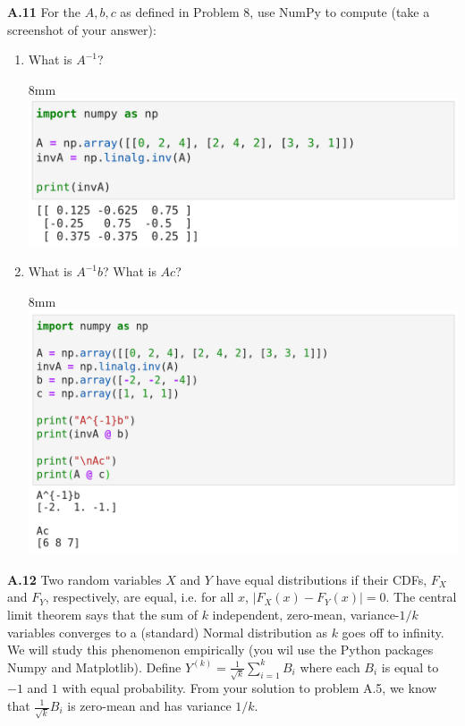 \documentclass{article}
\newenvironment{solution}{\begin{adjustwidth}{8mm}{}}{\end{adjustwidth}}
\begin{document}
\textbf{A.11}
For the $A,b,c$ as defined in Problem 8, use NumPy to compute (take a screenshot of your answer):
\begin{enumerate}
        \item What is $A^{-1}$?
        \begin{solution}
                \includegraphics[width=0.7\linewidth]{A11a.png}
        \end{solution}
        \item What is $A^{-1}b$? What is $Ac$?
        \begin{solution}
                \includegraphics[width=0.72\linewidth]{A11b.png}
        \end{solution}
\end{enumerate}


\textbf{A.12}
Two random variables $X$ and $Y$ have equal distributions if their CDFs, $F_X$ and $F_Y$, respectively, are equal, i.e. for all $x$, $|F_X(x)-F_Y(x)|=0$.
The central limit theorem says that the sum of $k$ independent, zero-mean, variance-$1/k$ variables converges to a (standard) Normal distribution as $k$ goes off to infinity.
We will study this phenomenon empirically (you wil use the Python packages Numpy and Matplotlib).
Define $Y^{(k)} = \frac{1}{\sqrt{k}} \sum_{i=1}^k B_i$ where each $B_i$ is equal to $-1$ and $1$ with equal probability. From your solution to problem A.5, we know that $\frac{1}{\sqrt{k}}B_i$ is zero-mean and has variance $1/k$.
\end{document}
